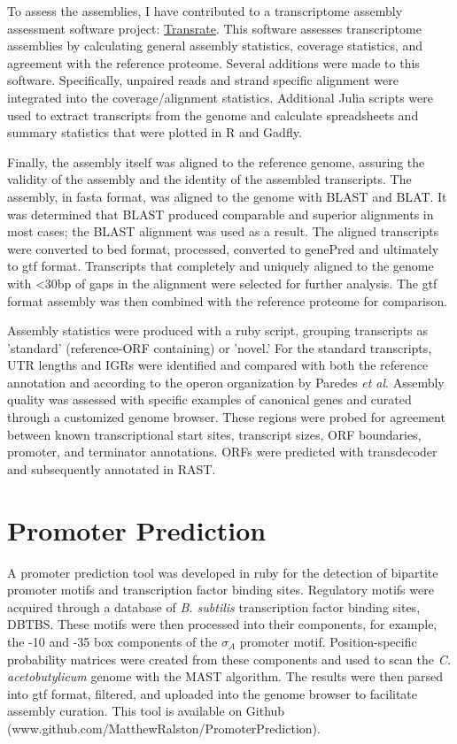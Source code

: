 To assess the assemblies, I have contributed to a transcriptome assembly assessment software project: \href{https://github.com/MatthewRalston/transrate}{Transrate}. This software assesses transcriptome assemblies by calculating general assembly statistics, coverage statistics, and agreement with the reference proteome. Several additions were made to this software. Specifically, unpaired reads and strand specific alignment were integrated into the coverage/alignment statistics. Additional Julia scripts were used to extract transcripts from the genome and calculate spreadsheets and summary statistics that were plotted in R and Gadfly.

Finally, the assembly itself was aligned to the reference genome, assuring the validity of the assembly and the identity of the assembled transcripts. The assembly, in fasta format, was aligned to the genome with BLAST\cite{184} and BLAT.\cite{183} It was determined that BLAST produced comparable and superior alignments in most cases; the BLAST alignment was used as a result. The aligned transcripts were converted to bed format, processed, converted to genePred and ultimately to gtf format. Transcripts that completely and uniquely aligned to the genome with \textless 30bp of gaps in the alignment were selected for further analysis. The gtf format assembly was then combined with the reference proteome for comparison. 

Assembly statistics were produced with a ruby script, grouping transcripts as 'standard' (reference-ORF containing) or 'novel.' For the standard transcripts, UTR lengths and IGRs were identified and compared with both the reference annotation and according to the operon organization by Paredes \textit{et al}.\cite{188}
Assembly quality was assessed with specific examples of canonical genes and curated through a customized genome browser. These regions were probed for agreement between known transcriptional start sites, transcript sizes, ORF boundaries, promoter, and terminator annotations.
ORFs were predicted with transdecoder and subsequently annotated in RAST.

\section{Promoter Prediction}\label{methods:promoter_prediction}
A promoter prediction tool was developed in ruby for the detection of bipartite promoter motifs and transcription factor binding sites. Regulatory motifs were acquired through a database of \textit{B. subtilis} transcription factor binding sites, DBTBS.\cite{189} These motifs were then processed into their components, for example, the -10 and -35 box components of the $\sigma_{A}$ promoter motif. Position-specific probability matrices were created from these components and used to scan the \textit{C. acetobutylicum} genome with the MAST algorithm.\cite{5} The results were then parsed into gtf format, filtered, and uploaded into the genome browser to facilitate assembly curation. This tool is available on Github (www.github.com/MatthewRalston/PromoterPrediction).

